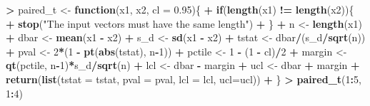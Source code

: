 \documentclass[]{krantz}
\makeatletter
\newenvironment{Shaded}{\begin{snugshade}}{\end{snugshade}}
\newcommand{\KeywordTok}[1]{\textcolor[rgb]{0.27,0.27,0.27}{\textbf{#1}}}
\newcommand{\DataTypeTok}[1]{\textcolor[rgb]{0.27,0.27,0.27}{#1}}
\newcommand{\DecValTok}[1]{\textcolor[rgb]{0.06,0.06,0.06}{#1}}
\newcommand{\FloatTok}[1]{\textcolor[rgb]{0.06,0.06,0.06}{#1}}
\newcommand{\StringTok}[1]{\textcolor[rgb]{0.5,0.5,0.5}{#1}}
\newcommand{\ControlFlowTok}[1]{\textcolor[rgb]{0.27,0.27,0.27}{\textbf{#1}}}
\newcommand{\OperatorTok}[1]{\textcolor[rgb]{0.43,0.43,0.43}{\textbf{#1}}}
\newcommand{\NormalTok}[1]{#1}
\newenvironment{kframe}{%
\medskip{}
\setlength{\fboxsep}{.8em}
 \def\at@end@of@kframe{}%
 \ifinner\ifhmode%
  \def\at@end@of@kframe{\end{minipage}}%
  \begin{minipage}{\columnwidth}%
 \fi\fi%
 \def\FrameCommand##1{\hskip\@totalleftmargin \hskip-\fboxsep
 \colorbox{shadecolor}{##1}\hskip-\fboxsep
     \hskip-\linewidth \hskip-\@totalleftmargin \hskip\columnwidth}%
 \MakeFramed {\advance\hsize-\width
   \@totalleftmargin\z@ \linewidth\hsize
   \@setminipage}}%
 {\par\unskip\endMakeFramed%
 \at@end@of@kframe}
\renewenvironment{Shaded}{\begin{kframe}}{\end{kframe}}
\makeatother
\begin{document}
\begin{Shaded}
\begin{Highlighting}[]
\OperatorTok{>}\StringTok{ }\NormalTok{paired_t <-}\StringTok{ }\ControlFlowTok{function}\NormalTok{(x1, x2, }\DataTypeTok{cl =} \FloatTok{0.95}\NormalTok{)\{}
\OperatorTok{+}\StringTok{     }\ControlFlowTok{if}\NormalTok{(}\KeywordTok{length}\NormalTok{(x1) }\OperatorTok{!=}\StringTok{ }\KeywordTok{length}\NormalTok{(x2))\{}
\OperatorTok{+}\StringTok{         }\KeywordTok{stop}\NormalTok{(}\StringTok{"The input vectors  must have the same length"}\NormalTok{)}
\OperatorTok{+}\StringTok{     }\NormalTok{\}}
\OperatorTok{+}\StringTok{     }\NormalTok{n <-}\StringTok{ }\KeywordTok{length}\NormalTok{(x1)}
\OperatorTok{+}\StringTok{     }\NormalTok{dbar <-}\StringTok{ }\KeywordTok{mean}\NormalTok{(x1 }\OperatorTok{-}\StringTok{ }\NormalTok{x2)}
\OperatorTok{+}\StringTok{     }\NormalTok{s_d <-}\StringTok{ }\KeywordTok{sd}\NormalTok{(x1 }\OperatorTok{-}\StringTok{ }\NormalTok{x2)}
\OperatorTok{+}\StringTok{     }\NormalTok{tstat <-}\StringTok{ }\NormalTok{dbar}\OperatorTok{/}\NormalTok{(s_d}\OperatorTok{/}\KeywordTok{sqrt}\NormalTok{(n))}
\OperatorTok{+}\StringTok{     }\NormalTok{pval <-}\StringTok{ }\DecValTok{2}\OperatorTok{*}\NormalTok{(}\DecValTok{1} \OperatorTok{-}\StringTok{ }\KeywordTok{pt}\NormalTok{(}\KeywordTok{abs}\NormalTok{(tstat), n}\OperatorTok{-}\DecValTok{1}\NormalTok{))}
\OperatorTok{+}\StringTok{     }\NormalTok{pctile <-}\StringTok{ }\DecValTok{1} \OperatorTok{-}\StringTok{ }\NormalTok{(}\DecValTok{1} \OperatorTok{-}\StringTok{ }\NormalTok{cl)}\OperatorTok{/}\DecValTok{2}
\OperatorTok{+}\StringTok{     }\NormalTok{margin <-}\StringTok{ }\KeywordTok{qt}\NormalTok{(pctile, n}\OperatorTok{-}\DecValTok{1}\NormalTok{)}\OperatorTok{*}\NormalTok{s_d}\OperatorTok{/}\KeywordTok{sqrt}\NormalTok{(n)}
\OperatorTok{+}\StringTok{     }\NormalTok{lcl <-}\StringTok{ }\NormalTok{dbar }\OperatorTok{-}\StringTok{ }\NormalTok{margin}
\OperatorTok{+}\StringTok{     }\NormalTok{ucl <-}\StringTok{ }\NormalTok{dbar }\OperatorTok{+}\StringTok{ }\NormalTok{margin}
\OperatorTok{+}\StringTok{     }\KeywordTok{return}\NormalTok{(}\KeywordTok{list}\NormalTok{(}\DataTypeTok{tstat =}\NormalTok{ tstat, }\DataTypeTok{pval =}\NormalTok{ pval, }\DataTypeTok{lcl =}\NormalTok{ lcl, }\DataTypeTok{ucl=}\NormalTok{ucl))}
\OperatorTok{+}\StringTok{ }\NormalTok{\}}
\OperatorTok{>}\StringTok{ }\KeywordTok{paired_t}\NormalTok{(}\DecValTok{1}\OperatorTok{:}\DecValTok{5}\NormalTok{, }\DecValTok{1}\OperatorTok{:}\DecValTok{4}\NormalTok{)}
\end{Highlighting}
\end{Shaded}
\end{document}
